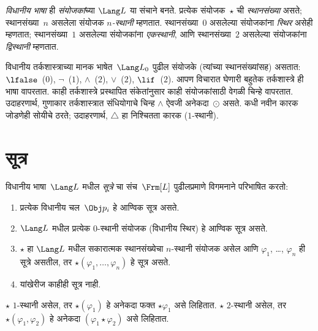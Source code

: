 \begin{defn}
  \emph{विधानीय भाषा} ही \emph{संयोजकां}च्या $\Lang L$
  या संचाने बनते. प्रत्येक संयोजक~$\star$ ची \emph{स्थानसंख्या}
  असते; स्थानसंख्या~$n$ असलेला संयोजक \emph{$n$-स्थानी}
  म्हणतात. स्थानसंख्या~$0$ असलेल्या संयोजकांना
  \emph{स्थिर} असेही म्हणतात; स्थानसंख्या~$1$ असलेल्या
  संयोजकांना \emph{एकस्थानी}, आणि स्थानसंख्या~$2$ असलेल्या
  संयोजकांना \emph{द्विस्थानी} म्हणतात.
\end{defn}

\begin{ex}
  विधानीय तर्कशास्त्राच्या मानक भाषेत~$\Lang L_0$ पुढील
  संयोजके (त्यांच्या स्थानसंख्यांसह) असतात:
  $\lfalse$~($0$),
  $\lnot$~($1$),
  $\land$~($2$),
  $\lor$~($2$),
  $\lif$~($2$). आपण विचारात घेणारी बहुतेक तर्कशास्त्रे
  ही भाषा वापरतात. काही तर्कशास्त्रे प्रस्थापित संकेतांनुसार
  काही संयोजकांसाठी वेगळी चिन्हे वापरतात. उदाहरणार्थ,
  गुणाकार तर्कशास्त्रात संधियोगाचे चिन्ह $\land$ ऐवजी
  अनेकदा~$\odot$ असते. कधी नवीन कारक जोडणेही सोयीचे
  ठरते; उदाहरणार्थ, $\triangle$ हा निश्चितता कारक
  ($1$-स्थानी).
\end{ex}












\section{सूत्र}\label{mvl:syn:fml:sec}

\begin{defn}[सूत्र]
\label{mvl:syn:fml:defn:formulas}
विधानीय भाषा~$\Lang L$ मधील \emph{सूत्रे} चा संच~$\Frm[L]$
पुढीलप्रमाणे विगमनाने परिभाषित करतो:
\begin{enumerate}
\item प्रत्येक विधानीय चल~$\Obj p_i$ हे आण्विक
  सूत्र असते.
\item $\Lang L$ मधील प्रत्येक $0$-स्थानी संयोजक (विधानीय स्थिर)
  हे आण्विक सूत्र असते.
\item $\star$ हा $\Lang L$ मधील सकारात्मक स्थानसंख्येचा
  $n$-स्थानी संयोजक असेल आणि
  $\varphi_1$, \dots, $\varphi_n$ ही सूत्रे असतील, तर
  $\star(\varphi_1, \dots, \varphi_n)$ हे सूत्र असते.
\item यांखेरीज काहीही सूत्र नाही.
\end{enumerate}
$\star$ $1$-स्थानी असेल, तर $\star(\varphi_1)$ हे अनेकदा फक्त
$\star \varphi_1$ असे लिहितात. $\star$ $2$-स्थानी असेल, तर
$\star(\varphi_1,\varphi_2)$ हे अनेकदा $(\varphi_1 \star \varphi_2)$ असे लिहितात.
\end{defn}

